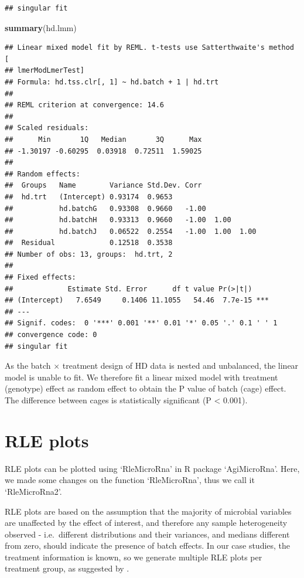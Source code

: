 \documentclass[]{book}
\newenvironment{Shaded}{\begin{snugshade}}{\end{snugshade}}
\newcommand{\KeywordTok}[1]{\textcolor[rgb]{0.13,0.29,0.53}{\textbf{#1}}}
\newcommand{\NormalTok}[1]{#1}
\begin{document}
\begin{verbatim}
## singular fit
\end{verbatim}

\begin{Shaded}
\begin{Highlighting}[]
\KeywordTok{summary}\NormalTok{(hd.lmm)}
\end{Highlighting}
\end{Shaded}

\begin{verbatim}
## Linear mixed model fit by REML. t-tests use Satterthwaite's method [
## lmerModLmerTest]
## Formula: hd.tss.clr[, 1] ~ hd.batch + 1 | hd.trt
## 
## REML criterion at convergence: 14.6
## 
## Scaled residuals: 
##      Min       1Q   Median       3Q      Max 
## -1.30197 -0.60295  0.03918  0.72511  1.59025 
## 
## Random effects:
##  Groups   Name        Variance Std.Dev. Corr             
##  hd.trt   (Intercept) 0.93174  0.9653                    
##           hd.batchG   0.93308  0.9660   -1.00            
##           hd.batchH   0.93313  0.9660   -1.00  1.00      
##           hd.batchJ   0.06522  0.2554   -1.00  1.00  1.00
##  Residual             0.12518  0.3538                    
## Number of obs: 13, groups:  hd.trt, 2
## 
## Fixed effects:
##             Estimate Std. Error      df t value Pr(>|t|)    
## (Intercept)   7.6549     0.1406 11.1055   54.46  7.7e-15 ***
## ---
## Signif. codes:  0 '***' 0.001 '**' 0.01 '*' 0.05 '.' 0.1 ' ' 1
## convergence code: 0
## singular fit
\end{verbatim}

As the batch \(\times\) treatment design of HD data is nested and
unbalanced, the linear model is unable to fit. We therefore fit a linear
mixed model with treatment (genotype) effect as random effect to obtain
the P value of batch (cage) effect. The difference between cages is
statistically significant (P \textless{} 0.001).

\section{RLE plots}\label{rle-plots}

RLE plots can be plotted using `RleMicroRna' in R package `AgiMicroRna'.
Here, we made some changes on the function `RleMicroRna', thus we call
it `RleMicroRna2'.

RLE plots are based on the assumption that the majority of microbial
variables are unaffected by the effect of interest, and therefore any
sample heterogeneity observed - i.e.~different distributions and their
variances, and medians different from zero, should indicate the presence
of batch effects. In our case studies, the treatment information is
known, so we generate multiple RLE plots per treatment group, as
suggested by \citep{lin2018scmerge}.
\end{document}
